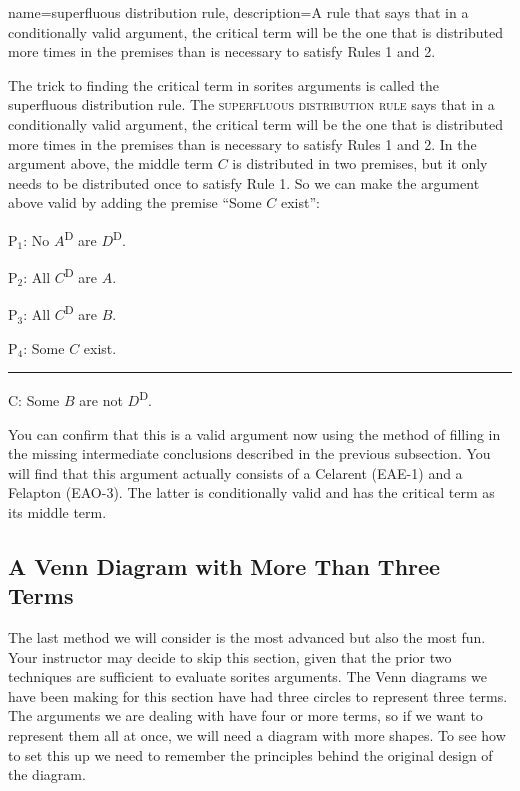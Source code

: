 {
{
name=superfluous distribution rule,
description={A rule that says that in a conditionally valid argument, the critical term will be the one that is distributed more times in the premises than is necessary to satisfy Rules 1 and 2.}
}

The trick to finding the critical term in sorites arguments is called the superfluous distribution rule. The \textsc{\gls{superfluous distribution rule}} \label{def:superfluous_distribution_rule} says that in a conditionally valid argument, the critical term will be the one that is distributed more times in the premises than is necessary to satisfy Rules 1 and 2. In the argument above, the middle term $C$ is distributed in two premises, but it only needs to be distributed once to satisfy Rule 1. So we can make the argument above valid by adding the premise ``Some $C$ exist'':


\begin{earg}
\item[P$_1$:] No $A$\textsuperscript{D} are $D$\textsuperscript{D}. 
\item[P$_2$:] All $C$\textsuperscript{D} are $A$.  %
\item[P$_3$:] All $C$\textsuperscript{D} are $B$. 
\item[P$_4$:] Some $C$ exist.
\vspace{-.5em}
\item [] \rule{0.3\linewidth}{.5pt} 
\item[C:] Some $B$ are not $D$\textsuperscript{D}. %
\end{earg} 

You can confirm that this is a valid argument now using the method of filling in the missing intermediate conclusions described in the previous subsection. You will find that this argument actually consists of a Celarent (EAE-1) and a Felapton (EAO-3). The latter is conditionally valid and has the critical term as its middle term.  

\subsection{A Venn Diagram with More Than Three Terms}

The last method we will consider is the most advanced but also the most fun. Your instructor may decide to skip this section, given that the prior two techniques are sufficient to evaluate sorites arguments. The Venn diagrams we have been making for this section have had three circles to represent three terms. The arguments we are dealing with have four or more terms, so if we want to represent them all at once, we will need a diagram with more shapes. To see how to set this up we need to remember the principles behind the original design of the diagram. 

}
